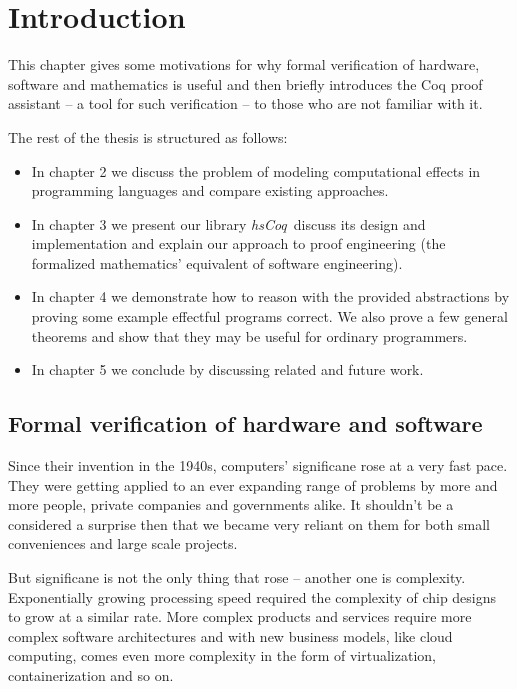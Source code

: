 \documentclass[declaration,inz,english,shortabstract]{iithesis}
\author         {Zeimer}
\date           {wrzesień 2019}                     %
\newcommand{\libname}{\textit{hsCoq}}
\begin{document}

\chapter{Introduction}

This chapter gives some motivations for why formal verification of hardware, software and mathematics is useful and then briefly introduces the Coq proof assistant -- a tool for such verification -- to those who are not familiar with it.

The rest of the thesis is structured as follows:

\begin{itemize}
    \item In chapter 2 we discuss the problem of modeling computational effects in programming languages and compare existing approaches.
    \item In chapter 3 we present our library \libname\, discuss its design and implementation and explain our approach to proof engineering (the formalized mathematics' equivalent of software engineering).
    \item In chapter 4 we demonstrate how to reason with the provided abstractions by proving some example effectful programs correct. We also prove a few general theorems and show that they may be useful for ordinary programmers.
    \item In chapter 5 we conclude by discussing related and future work.
\end{itemize}

\section{Formal verification of hardware and software}

Since their invention in the 1940s, computers' significane rose at a very fast pace. They were getting applied to an ever expanding range of problems by more and more people, private companies and governments alike. It shouldn't be a considered a surprise then that we became very reliant on them for both small conveniences and large scale projects.

But significane is not the only thing that rose -- another one is complexity. Exponentially growing processing speed required the complexity of chip designs to grow at a similar rate. More complex products and services require more complex software architectures and with new business models, like cloud computing, comes even more complexity in the form of virtualization, containerization and so on.
\end{document}
